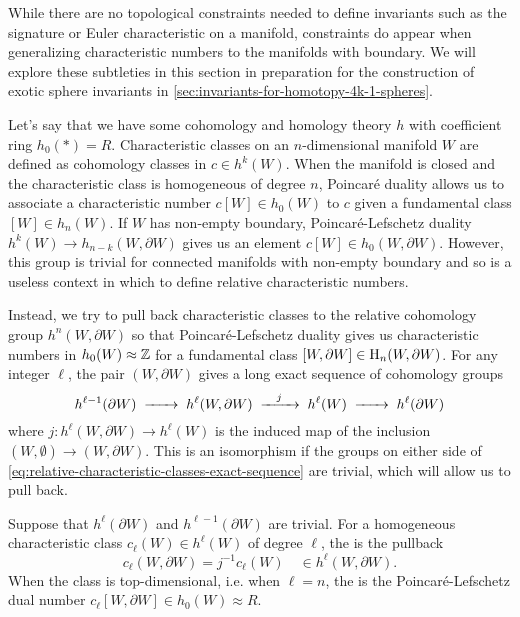 While there are no topological constraints needed to define invariants such as the signature or Euler characteristic on a manifold, constraints do appear when generalizing characteristic numbers to the manifolds with boundary. We will explore these subtleties in this section in preparation for the construction of exotic sphere invariants in \cref{sec:invariants-for-homotopy-4k-1-spheres}.

Let's say that we have some cohomology and homology theory $h$ with coefficient ring $h_0(*)=R$.
Characteristic classes on an $n$-dimensional manifold $W$ are defined as cohomology classes in $c\in h^k(W)$. When the manifold is closed and the characteristic class is homogeneous of degree $n$, Poincar\'e duality allows us to associate a characteristic number $c[W]\in h_0(W)$ to $c$ given a fundamental class $[W]\in h_n(W)$. If $W$ has non-empty boundary, Poincar\'e-Lefschetz duality $h^k(W)\to h_{n-k}(W,\partial W)$ gives us an element $c[W]\in h_0(W,\partial W)$. However, this group is trivial for connected manifolds with non-empty boundary and so is a useless context in which to define relative characteristic numbers. 

Instead, we try to pull back characteristic classes to the relative cohomology group $h^n(W,\partial W)$ so that Poincar\'e-Lefschetz duality gives us characteristic numbers in $h_0(W)\approx \mathbb{Z}$ for a fundamental class $[W,\partial W]\in \operatorname{H}_n(W,\partial W)$.
For any integer $\ell$, the pair $(W, \partial W)$ gives a long exact sequence of cohomology groups
\begin{equation}\label{eq:relative-characteristic-classes-exact-sequence}
	h^{\ell-1}(\partial W) \lkxto h^{\ell}(W, \partial W) \lkxto[j] h^{\ell}(W) \lkxto h^{\ell}(\partial W)
\end{equation}
where $j : h^{\ell}(W, \partial W) \to h^{\ell}(W)$ is the induced map of the inclusion $(W,\emptyset) \to (W, \partial W)$. This is an isomorphism if the groups on either side of \cref{eq:relative-characteristic-classes-exact-sequence} are trivial, which will allow us to pull back.

\begin{definition}\label{defn:relative-characteristic_form}
	Suppose that $h^{\ell}(\partial W)$ and $h^{\ell-1}(\partial W)$ are trivial. For a homogeneous characteristic class $c_\ell(W) \in h^{\ell}(W)$ of degree $\ell$, the  is the pullback
	\[
		c_\ell(W, \partial W) = j^{-1} c_\ell(W) \quad\in h^{\ell}(W, \partial W).
	\]
	When the class is top-dimensional, i.e. when $\ell=n$, the  is the Poincar\'e-Lefschetz dual number $c_\ell[W,\partial W] \in h_0(W)\approx R$.
\end{definition}

